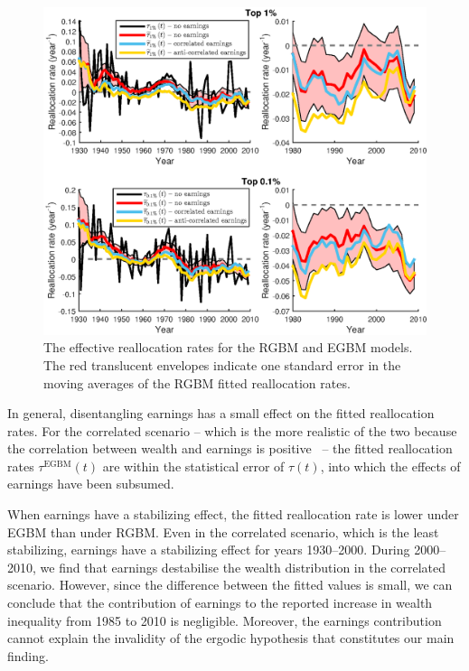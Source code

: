 \begin{figure}[!htb]
\centering
\includegraphics[width=1.0\textwidth] {./chapter_3/figs/tau_with_earnings.eps}
\caption{The effective reallocation rates for the RGBM and EGBM models. The red translucent envelopes indicate one standard error in the moving averages of the RGBM fitted reallocation rates.}
\end{figure}

In general, disentangling earnings has a small effect on the fitted reallocation rates. For the correlated scenario -- which is the more realistic of the two because the correlation between wealth and earnings is positive~\cite{Rios20162013} -- the fitted reallocation rates $\tau^\text{EGBM}\left(t\right)$ are within the statistical error of $\tau\left(t\right)$, into which the effects of earnings have been subsumed.

When earnings have a stabilizing effect, the fitted reallocation rate is lower under EGBM than under RGBM. Even in the correlated scenario, which is the least stabilizing, earnings have a stabilizing effect for years 1930--2000. During 2000--2010, we find that earnings destabilise the wealth distribution in the correlated scenario. However, since the difference between the fitted values is small, we can conclude that the contribution of earnings to the reported increase in wealth inequality from 1985 to 2010 is negligible. Moreover, the earnings contribution cannot explain the invalidity of the ergodic hypothesis that constitutes our main finding.

